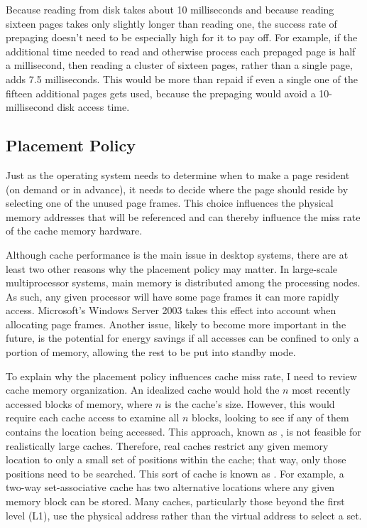 Because reading from disk takes about 10 milliseconds and
because reading sixteen pages takes only slightly longer than reading one,
the success rate of prepaging doesn't need to be especially high for
it to pay off.  For example, if the additional time needed to read and
otherwise process each prepaged page is half a millisecond, then
reading a cluster of sixteen pages, rather than a single page, adds 7.5
milliseconds.  This would be more than repaid if even a single one of
the fifteen additional pages gets used, because the prepaging would avoid a 10-millisecond disk
access time.

\subsection{Placement Policy}

Just as the operating system needs to determine when to make a
page resident (on demand or in advance), it needs to decide
where the page should reside by selecting one of the unused page
frames. This choice influences the physical memory addresses that will
be referenced and can thereby influence the miss rate of the cache memory hardware.

Although cache performance is the main issue in desktop systems, there
are at least two other reasons why the placement policy may matter.
In large-scale multiprocessor systems, main memory is distributed
among the processing nodes.  As such, any given processor will have
some page frames it can more rapidly access.  Microsoft's Windows
Server 2003 takes this effect into account when allocating page
frames.  Another issue, likely to become more important in the future,
is the potential for energy savings if all accesses can be confined to
only a portion of memory, allowing the rest to be put into standby
mode.

To explain why the placement policy influences cache miss rate, I
need to review cache memory organization.  An idealized cache would
hold the $n$ most recently accessed blocks of memory, where $n$ is the
cache's size.  However, this would require each cache access to
examine all $n$ blocks, looking to see if any of them contains the
location being accessed.  This approach, known as ,
is not feasible for realistically large caches.  Therefore, real
caches restrict any given memory location to only a small set of
positions within the cache; that way, only those positions need to be
searched.  This sort of cache is known as .  For
example, a two-way set-associative cache has two alternative locations where
any given memory block can be stored.  Many caches, particularly
those beyond the first level (L1), use the physical address rather than
the virtual address to select a set.

